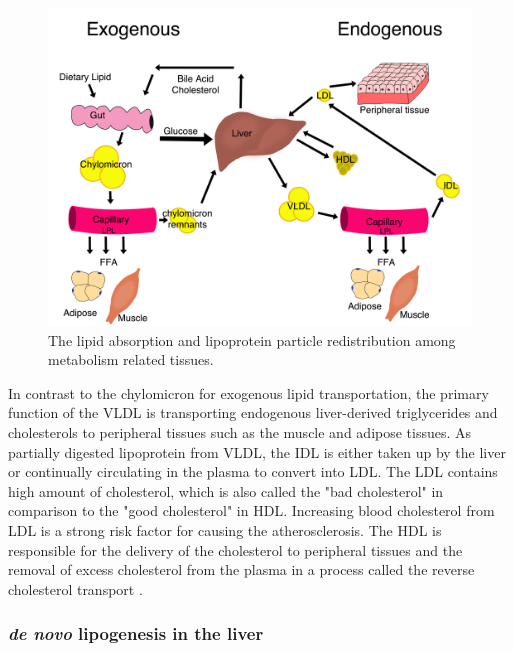 \begin{figure}[!tb]
\centering
\includegraphics[width=1\textwidth]{figs/fig1-3 liver lipid.png}
\caption[Lipid redistribution in the whole body]{\footnotesize The lipid absorption and lipoprotein particle redistribution among metabolism related tissues.}
\label{fig:fig1.3}
\end{figure}

In contrast to the chylomicron for exogenous lipid transportation, the primary function of the VLDL is transporting endogenous liver-derived triglycerides and cholesterols to peripheral tissues such as the muscle and adipose tissues. As partially digested lipoprotein from VLDL, the IDL is either taken up by the liver or continually circulating in the plasma to convert into LDL. The LDL contains high amount of cholesterol, which is also called the "bad cholesterol" in comparison to the "good cholesterol" in HDL. Increasing blood cholesterol from LDL is a strong risk factor for causing the atherosclerosis. The HDL is responsible for the delivery of the cholesterol to peripheral tissues and the removal of excess cholesterol from the plasma in a process called the reverse cholesterol transport \cite{mahley_putting_2006,van_der_velde_reverse_2010}.

\subsubsection{\textit{de novo} lipogenesis in the liver}

